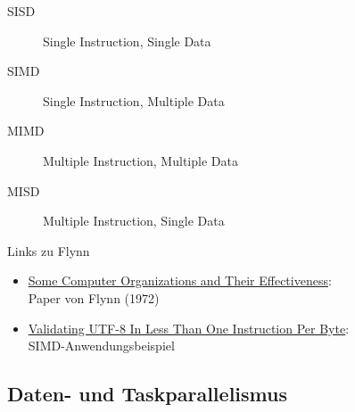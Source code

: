 \documentclass{beamer}
\begin{document}
\begin{frame}{SISD}
	\begin{figure}
		
		\caption*{Single Instruction, Single Data}
	\end{figure}
\end{frame}

\begin{frame}{SIMD}
	\begin{figure}
		
		\caption*{Single Instruction, Multiple Data}
	\end{figure}
\end{frame}

\begin{frame}{MIMD}
	\begin{figure}
		
		\caption*{Multiple Instruction, Multiple Data}
	\end{figure}
\end{frame}

\begin{frame}{MISD}
	\begin{figure}
		
		\caption*{Multiple Instruction, Single Data}
	\end{figure}
\end{frame}

\begin{frame}{Links zu Flynn}
	\begin{itemize}
		\item \href{https://www.cs.utah.edu/~hari/teaching/paralg/Flynn72.pdf}{Some Computer Organizations and Their Effectiveness}: \\
			  Paper von Flynn (1972)
		\item \href{https://arxiv.org/abs/2010.03090}{Validating UTF-8 In Less Than One Instruction Per Byte}: \\
			  SIMD-Anwendungsbeispiel
	\end{itemize}
\end{frame}

\subsection{Daten- und Taskparallelismus}
\end{document}
